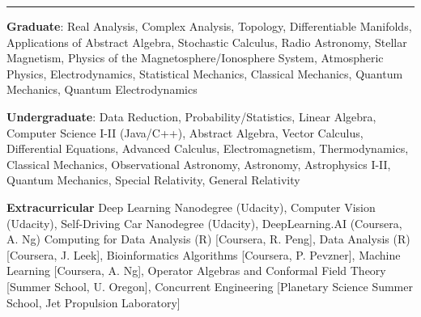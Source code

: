 \documentclass[10pt]{article}
\newcommand{\ressection}[1]{\noindent{\large\textbf{#1}}
\vspace{2pt}\hrule\vspace{4pt}}
\begin{document}
\ressection{Relevant Coursework}
\noindent\textbf{Graduate}:
    Real Analysis, Complex Analysis, Topology, Differentiable Manifolds,
    Applications of Abstract Algebra, Stochastic Calculus, 
    Radio Astronomy, Stellar Magnetism, Physics of the Magnetosphere/Ionosphere System,
    Atmospheric Physics, Electrodynamics, Statistical Mechanics,
    Classical Mechanics, Quantum Mechanics, Quantum Electrodynamics
\par\vspace{0.5em}
\noindent\textbf{Undergraduate}:
    Data Reduction, Probability/Statistics, Linear Algebra, Computer
    Science I-II (Java/C++), Abstract Algebra, Vector Calculus,
    Differential Equations, Advanced Calculus, Electromagnetism,
    Thermodynamics, Classical Mechanics, Observational Astronomy,
    Astronomy, Astrophysics I-II,  Quantum Mechanics, Special
    Relativity, General Relativity
\par\vspace{0.5em}
\noindent\textbf{Extracurricular}
    Deep Learning Nanodegree (Udacity), Computer Vision (Udacity), 
    Self-Driving Car Nanodegree (Udacity), DeepLearning.AI (Coursera, A.  Ng)
    Computing for Data Analysis (R) [Coursera, R. Peng], Data Analysis
    (R) [Coursera, J. Leek], Bioinformatics Algorithms [Coursera, P.
    Pevzner], Machine Learning [Coursera, A. Ng], Operator Algebras and
    Conformal Field Theory [Summer School, U. Oregon], Concurrent
    Engineering [Planetary Science Summer School, Jet Propulsion
    Laboratory]
\end{document}

